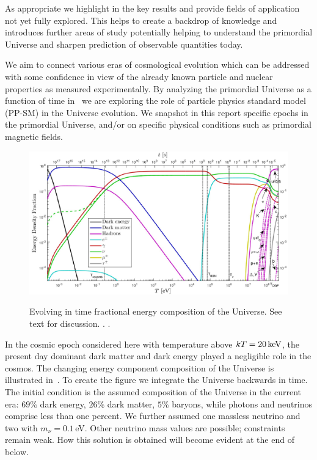 {\color{black}As appropriate we highlight in  the key results and provide fields of application not yet fully explored. This helps to create a backdrop of knowledge and introduces further areas of study potentially helping to understand the primordial Universe and sharpen prediction of observable quantities today.} 

We aim to connect various eras of cosmological evolution which can be addressed with some confidence in view of the already known particle and nuclear properties as measured experimentally. By analyzing the primordial Universe as a function of time in~ we are exploring the role of particle physics standard model (PP-SM) in the Universe evolution. We snapshot in this report specific epochs in the primordial Universe, and/or on specific physical conditions such as primordial magnetic fields.

\begin{figure}
\includegraphics[width=\linewidth]{plots/energyFractions.jpg}\label{fig:energy:frac}
\caption{Evolving in time fractional energy composition of the Universe. See text for discussion. . .}
\end{figure}

In the cosmic epoch considered here with temperature above $kT=20\text{\,keV}$, the present day dominant dark matter and dark energy played a negligible role in the cosmos. The changing energy component composition of the Universe is illustrated in~. To create the figure we integrate the Universe backwards in time. The initial condition is the assumed composition of the Universe in the current era: $69\%$ dark energy, $26\%$ dark matter, $5\%$ baryons, while photons and neutrinos comprise less than one percent. We further assumed one massless neutrino and two with $m_\nu=0.1$\,eV. Other neutrino mass values are possible; constraints remain weak. How this solution is obtained will become evident at the end of~ below. 

